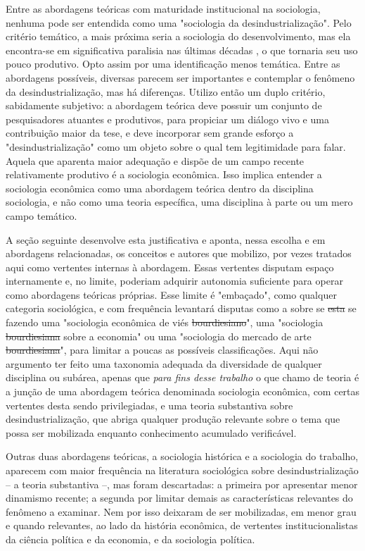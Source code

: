 Entre as abordagens teóricas com maturidade institucional na sociologia, nenhuma pode ser entendida como uma
"sociologia da desindustrialização". Pelo critério temático, a mais próxima seria a sociologia do desenvolvimento, mas ela encontra-se em significativa paralisia nas últimas décadas , o que tornaria seu uso
pouco produtivo. Opto assim por uma identificação menos temática. Entre as abordagens possíveis, diversas parecem ser importantes e contemplar o fenômeno da desindustrialização, 
mas há diferenças. Utilizo então um duplo critério, sabidamente subjetivo: a abordagem teórica deve possuir um conjunto de pesquisadores
atuantes e produtivos, para propiciar um diálogo vivo e uma contribuição maior da tese, e deve incorporar sem grande esforço a "desindustrialização" como um objeto sobre o qual tem legitimidade para falar. Aquela que aparenta maior adequação 
e dispõe de um campo recente relativamente produtivo é a sociologia econômica. Isso implica entender a sociologia econômica como uma abordagem teórica dentro da disciplina sociologia, e não como uma teoria específica, uma disciplina à parte ou um mero campo temático.

A seção seguinte desenvolve esta justificativa e aponta, nessa escolha e em abordagens relacionadas, os conceitos e autores que mobilizo, por vezes tratados aqui como vertentes internas à abordagem. Essas vertentes disputam espaço internamente e, no limite, poderiam adquirir autonomia suficiente para operar como abordagens teóricas próprias. Esse limite é "embaçado", como qualquer categoria sociológica, e com frequência levantará disputas como a sobre se \sout{esta} se fazendo uma "sociologia econômica de viés \sout{bourdiesiano}", uma "sociologia \sout{bourdiesiana} sobre a economia" ou uma "sociologia do mercado de arte \sout{bourdiesiana}", para limitar a poucas as possíveis classificações. Aqui não argumento ter feito uma taxonomia adequada da diversidade de qualquer disciplina ou subárea, apenas que \emph{para fins desse trabalho} o que chamo de teoria é a junção de uma abordagem teórica denominada sociologia econômica, com certas vertentes desta sendo privilegiadas, e uma teoria substantiva sobre desindustrialização, que abriga qualquer produção relevante sobre o tema que possa ser mobilizada enquanto conhecimento acumulado verificável.

Outras duas abordagens teóricas, a sociologia histórica e a sociologia do trabalho, aparecem com maior frequência na literatura sociológica sobre desindustrialização -- a teoria substantiva --, mas foram descartadas: a primeira por apresentar menor dinamismo recente; a segunda por limitar demais as características relevantes do fenômeno a examinar. Nem por isso deixaram de ser mobilizadas, em menor grau e quando relevantes, ao lado da história econômica, de vertentes institucionalistas da ciência política e da economia, e da sociologia política.

